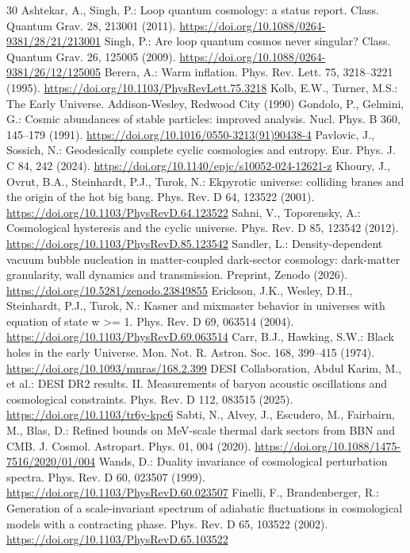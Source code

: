 \documentclass[pdflatex,sn-mathphys-num]{sn-jnl}
\begin{document}
\begin{thebibliography}{30}
 Ashtekar, A., Singh, P.: Loop quantum cosmology: a status report. Class. Quantum Grav. 28, 213001 (2011). \url{https://doi.org/10.1088/0264-9381/28/21/213001}
 Singh, P.: Are loop quantum cosmos never singular? Class. Quantum Grav. 26, 125005 (2009). \url{https://doi.org/10.1088/0264-9381/26/12/125005}
 Berera, A.: Warm inflation. Phys. Rev. Lett. 75, 3218--3221 (1995). \url{https://doi.org/10.1103/PhysRevLett.75.3218}
 Kolb, E.W., Turner, M.S.: The Early Universe. Addison-Wesley, Redwood City (1990)
 Gondolo, P., Gelmini, G.: Cosmic abundances of stable particles: improved analysis. Nucl. Phys. B 360, 145--179 (1991). \url{https://doi.org/10.1016/0550-3213(91)90438-4}
 Pavlovic, J., Sossich, N.: Geodesically complete cyclic cosmologies and entropy. Eur. Phys. J. C 84, 242 (2024). \url{https://doi.org/10.1140/epjc/s10052-024-12621-z}
 Khoury, J., Ovrut, B.A., Steinhardt, P.J., Turok, N.: Ekpyrotic universe: colliding branes and the origin of the hot big bang. Phys. Rev. D 64, 123522 (2001). \url{https://doi.org/10.1103/PhysRevD.64.123522}
 Sahni, V., Toporensky, A.: Cosmological hysteresis and the cyclic universe. Phys. Rev. D 85, 123542 (2012). \url{https://doi.org/10.1103/PhysRevD.85.123542}
 Sandler, L.: Density-dependent vacuum bubble nucleation in matter-coupled dark-sector cosmology: dark-matter granularity, wall dynamics and transmission. Preprint, Zenodo (2026). \url{https://doi.org/10.5281/zenodo.23849855}
 Erickson, J.K., Wesley, D.H., Steinhardt, P.J., Turok, N.: Kasner and mixmaster behavior in universes with equation of state w >= 1. Phys. Rev. D 69, 063514 (2004). \url{https://doi.org/10.1103/PhysRevD.69.063514}
 Carr, B.J., Hawking, S.W.: Black holes in the early Universe. Mon. Not. R. Astron. Soc. 168, 399--415 (1974). \url{https://doi.org/10.1093/mnras/168.2.399}
 DESI Collaboration, Abdul Karim, M., et al.: DESI DR2 results. II. Measurements of baryon acoustic oscillations and cosmological constraints. Phys. Rev. D 112, 083515 (2025). \url{https://doi.org/10.1103/tr6y-kpc6}
 Sabti, N., Alvey, J., Escudero, M., Fairbairn, M., Blas, D.: Refined bounds on MeV-scale thermal dark sectors from BBN and CMB. J. Cosmol. Astropart. Phys. 01, 004 (2020). \url{https://doi.org/10.1088/1475-7516/2020/01/004}
 Wands, D.: Duality invariance of cosmological perturbation spectra. Phys. Rev. D 60, 023507 (1999). \url{https://doi.org/10.1103/PhysRevD.60.023507}
 Finelli, F., Brandenberger, R.: Generation of a scale-invariant spectrum of adiabatic fluctuations in cosmological models with a contracting phase. Phys. Rev. D 65, 103522 (2002). \url{https://doi.org/10.1103/PhysRevD.65.103522}

\end{thebibliography}
\end{document}
